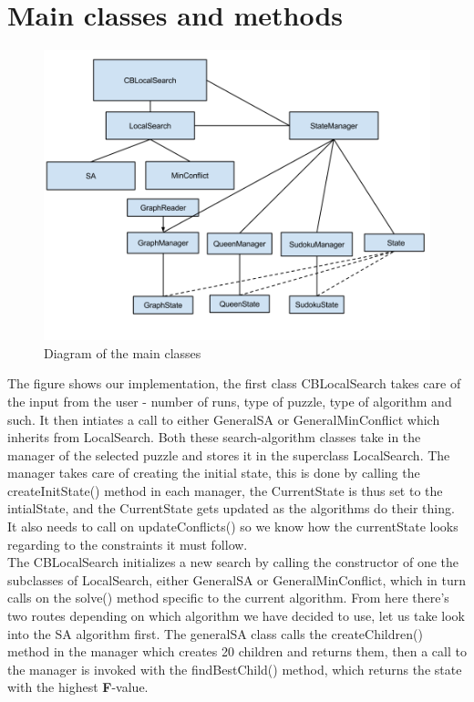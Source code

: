 \documentclass[12pt, a4paper]{article}
\begin{document}
\section{Main classes and methods}
\begin{figure}[H] \includegraphics[width=15cm]{2_Diagram}

\caption{Diagram of the main classes}
\label{diagram}
\end{figure}
The figure shows our implementation, the first class CBLocalSearch takes care of the input from the user - number of runs, type of puzzle, type of algorithm and such. It then intiates a call to either GeneralSA or GeneralMinConflict which inherits from LocalSearch. Both these search-algorithm classes take in the manager of the selected puzzle and stores it in the superclass LocalSearch. The manager takes care of creating the initial state, this is done by calling the createInitState() method in each manager, the CurrentState is thus set to the intialState, and the CurrentState gets updated as the algorithms do their thing. It also needs to call on updateConflicts() so we know how the currentState looks regarding to the constraints it must follow.\\
The CBLocalSearch initializes a new search by calling the constructor of one the subclasses of LocalSearch, either GeneralSA or GeneralMinConflict, which in turn calls on the solve() method specific to the current algorithm. From here there's two routes depending on which algorithm we have decided to use, let us take look into the SA algorithm first. The generalSA class calls the createChildren() method in the manager which creates 20 children and returns them, then a call to the manager is invoked with the findBestChild() method, which returns the state with the highest \textbf{F}-value. \\
\end{document}
